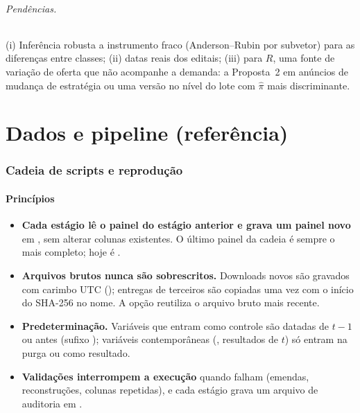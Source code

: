 \documentclass[12pt,a4paper]{article}
\begin{document}
\paragraph{Pendências.}\label{sec:prop1_pend} (i) Inferência robusta a instrumento fraco
(Anderson--Rubin por subvetor) para as diferenças entre classes; (ii) datas reais dos
editais; (iii) para \(R\), uma fonte de variação de oferta que não acompanhe a
demanda: a Proposta~2 em anúncios de mudança de estratégia ou uma versão no nível
do lote com \(\hat\pi\) mais discriminante.

\part{Dados e pipeline (referência)}

\section{Cadeia de scripts e reprodução}\label{sec:pipeline}

\subsection{Princípios}

\begin{itemize}[leftmargin=1.2cm]
    \item \textbf{Cada estágio lê o painel do estágio anterior e grava um painel
    novo} em , sem alterar colunas existentes. O último painel da
    cadeia é sempre o mais completo; hoje é
    .
    \item \textbf{Arquivos brutos nunca são sobrescritos.} Downloads novos são
    gravados com carimbo UTC (); entregas de terceiros
    são copiadas uma vez com o início do SHA-256 no nome. A opção 
    reutiliza o arquivo bruto mais recente.
    \item \textbf{Predeterminação.} Variáveis que entram como controle são datadas
    de \(t-1\) ou antes (sufixo ); variáveis contemporâneas
    (, resultados de \(t\)) só entram na purga ou como resultado.
    \item \textbf{Validações interrompem a execução} quando falham (emendas,
    reconstruções, colunas repetidas), e cada estágio grava um arquivo de auditoria
    em .
\end{itemize}
\end{document}

